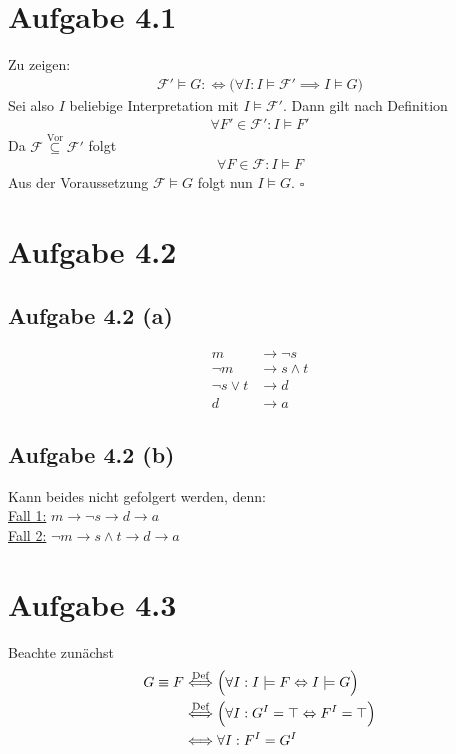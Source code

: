 \documentclass[12pt,a4paper]{article}
\author{Willi Sontopski}
\newcommand{\F}{\mathcal{F}}
\begin{document}

\section*{Aufgabe 4.1}
Zu zeigen:
\begin{align*}
\F'\models G:\Longleftrightarrow\big(\forall I:I\models\F'\implies I\models G\big)
\end{align*}
Sei also $I$ beliebige Interpretation mit $I\models\F'$. Dann gilt nach Definition
\begin{align*}
\forall F'\in\F':I\models F'
\end{align*}
Da $\F\stackrel{\text{Vor}}{\subseteq}\F'$ folgt 
\begin{align*}
\forall F\in\F:I\models F
\end{align*}
Aus der Voraussetzung $\F\models G$ folgt nun $I\models G$. $\square$

\section*{Aufgabe 4.2}
\subsection*{Aufgabe 4.2 (a)}
\begin{align*}
m &\to\neg s\\
\neg m&\to s\wedge t\\
\neg s\vee t&\to d\\
d&\to a
\end{align*}

\subsection*{Aufgabe 4.2 (b)}
Kann beides nicht gefolgert werden, denn:\\
\underline{Fall 1:} $m\to \neg s\to d\to a$\\
\underline{Fall 2:} $\neg m\to s\wedge t\to d\to a$\\

\section*{Aufgabe 4.3}
Beachte zunächst
\begin{align*}
G\equiv F &\stackrel{\text{Def}}{\Longleftrightarrow}
\Big(\forall I:I\models F\Leftrightarrow I\models G\Big)\\
&\stackrel{\text{Def}}{\Longleftrightarrow}\Big(\forall I:G^I=\top\Leftrightarrow F^I=\top\Big)\\
&\Longleftrightarrow\forall I:F^I=G^I
\end{align*}
\end{document}
